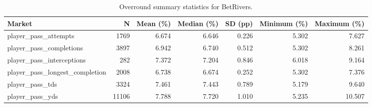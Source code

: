 \begin{table}
\caption{Overround summary statistics for BetRivers.}
\label{tab:overround_betrivers}
\begin{tabular}{lrrrrrr}
\toprule
Market & N & Mean (\%) & Median (\%) & SD (pp) & Minimum (\%) & Maximum (\%) \\
\midrule
player\_pass\_attempts & 1769 & 6.674 & 6.646 & 0.226 & 5.302 & 7.627 \\
player\_pass\_completions & 3897 & 6.942 & 6.740 & 0.512 & 5.302 & 8.261 \\
player\_pass\_interceptions & 282 & 7.372 & 7.204 & 0.846 & 6.018 & 9.164 \\
player\_pass\_longest\_completion & 2008 & 6.738 & 6.674 & 0.252 & 5.302 & 7.376 \\
player\_pass\_tds & 3324 & 7.461 & 7.443 & 0.789 & 5.179 & 9.640 \\
player\_pass\_yds & 11106 & 7.788 & 7.720 & 1.010 & 5.235 & 10.507 \\
\bottomrule
\end{tabular}
\end{table}
